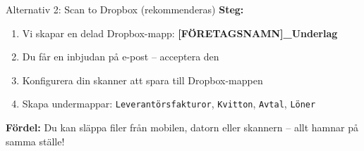 \documentclass[10pt]{beamer}
\begin{document}
\begin{frame}[fragile]
  \vspace{0.4cm}

  \begin{block}{Alternativ 2: Scan to Dropbox (rekommenderas)}
    \footnotesize
    \textbf{Steg:}
    \begin{enumerate}
      \item Vi skapar en delad Dropbox-mapp: \textbf{[FÖRETAGSNAMN]\_Underlag}
      \item Du får en inbjudan på e-post – acceptera den
      \item Konfigurera din skanner att spara till Dropbox-mappen
      \item Skapa undermappar: \texttt{Leverantörsfakturor}, \texttt{Kvitton}, \texttt{Avtal}, \texttt{Löner}
    \end{enumerate}
    \textbf{Fördel:} Du kan släppa filer från mobilen, datorn eller skannern – allt hamnar på samma ställe!
  \end{block}

  \vspace{0.4cm}
  \begin{center}
  \end{center}

\end{frame}
\end{document}
